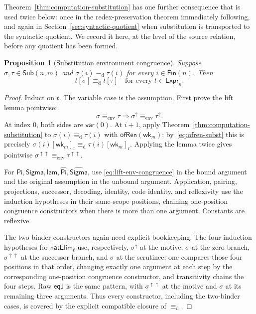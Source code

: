 \documentclass[10pt,reqno]{amsart}
\newtheorem{proposition}[theorem]{Proposition}
\newcommand{\Fin}{\mathsf{Fin}}
\newcommand{\Expr}{\mathsf{Expr}}
\newcommand{\Sub}{\mathsf{Sub}}
\newcommand{\Var}{\mathsf{var}}
\newcommand{\PiTy}{\mathsf{Pi}}
\newcommand{\SigmaTy}{\mathsf{Sigma}}
\newcommand{\Lam}{\mathsf{lam}}
\newcommand{\NatElim}{\mathsf{natElim}}
\newcommand{\CodePi}{\widehat{\mathsf{Pi}}}
\newcommand{\CodeSigma}{\widehat{\mathsf{Sigma}}}
\newcommand{\EqJ}{\mathsf{eqJ}}
\newcommand{\defeq}{\mathrel{\equiv_{\mathrm d}}}
\newcommand{\wk}{\mathsf{wk}}
\newcommand{\lift}{\uparrow}
\begin{document}
Theorem~\ref{thm:computation-substitution} has one further consequence that is
used twice below: once in the redex-preservation theorem immediately following,
and again in Section~\ref{sec:syntactic-quotient} when substitution is
transported to the syntactic quotient.  We record it here, at the level of the
source relation, before any quotient has been formed.

\begin{proposition}[Substitution environment congruence]
\label{prop:environment-congruence}
Suppose \(\sigma,\tau\in\Sub(n,m)\) and
\(\sigma(i)\defeq\tau(i)\) for every \(i\in\Fin(n)\).  Then
\[
                     t[\sigma]\defeq t[\tau]
                     \quad\text{for every }t\in\Expr_n.
\tag{5.6}\label{eq:subst-congruence}
\]
\end{proposition}

\begin{proof}
Induct on \(t\).  The variable case is the assumption.  First prove the lift
lemma pointwise:
\[
 \sigma\equiv_{\mathrm{env}}\tau
 \Longrightarrow
 \sigma^\lift\equiv_{\mathrm{env}}\tau^\lift.
\tag{5.7}\label{eq:lift-env-congruence}
\]
At index \(0\), both sides are \(\Var(0)\).  At \(i+1\), apply
Theorem~\ref{thm:computation-substitution} to
\(\sigma(i)\defeq\tau(i)\) with
\(\mathsf{ofRen}(\wk_m)\); by~\eqref{eq:ofren-subst} this is precisely
\(\sigma(i)[\wk_m]_{\mathrm r}\defeq
  \tau(i)[\wk_m]_{\mathrm r}\).  Applying the lemma twice gives pointwise
\(\sigma^{\lift\lift}\equiv_{\mathrm{env}}
 \tau^{\lift\lift}\).

For \(\PiTy,\SigmaTy,\Lam,\CodePi,\CodeSigma\), use
\eqref{eq:lift-env-congruence} in the bound argument and the original
assumption in the unbound argument.  Application, pairing, projections,
successor, decoding, identity, code identity, and reflexivity use the
induction hypotheses in their same-scope positions, chaining one-position
congruence constructors when there is more than one argument.  Constants
are reflexive.

The two-binder constructors again need explicit bookkeeping.  The four
induction hypotheses for \(\NatElim_\ell\) use, respectively,
\(\sigma^\lift\) at the motive, \(\sigma\) at the zero branch,
\(\sigma^{\lift\lift}\) at the successor branch, and \(\sigma\) at the
scrutinee; one compares those four positions in that order, changing exactly
one argument at each step by the corresponding one-position congruence
constructor, and transitivity chains the four steps.  Raw \(\EqJ\) is the same
pattern, with \(\sigma^{\lift\lift}\) at the motive and \(\sigma\) at its
remaining three arguments.  Thus every constructor, including the two-binder
cases, is covered by the explicit compatible closure of \(\defeq\).
\end{proof}
\end{document}
